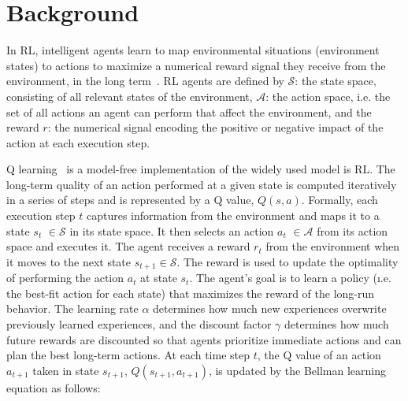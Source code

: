 
\section{Background}
\label{sec:background}

In \ac{RL}, intelligent agents learn to map environmental situations (environment states) to actions to maximize a numerical reward signal they receive from the environment, in the long term~\cite{sutton18}. \ac{RL} agents are defined by
$\mathcal{S}$: the state space, consisting of all relevant states of the environment,
$\mathcal{A}$: the action space, i.e. the set of all actions an agent can perform that affect the environment, and the reward $r$: the numerical signal encoding the positive or negative impact of the action at each execution step.

Q learning~\cite{watkins92} is a model-free implementation of the widely used model
is \ac{RL}. The long-term quality of an action performed at a given state is computed iteratively in a series of steps and is represented by a Q value,
$\mathit{Q(s,a)}$.
Formally, each execution step $t$ captures information from the environment and maps it to a state
{\color{purple}$s_t$} $\in \mathcal{S}$ in its state space. It then selects an
action {\color{purple}$a_t$} $\in \mathcal{A}$ from its action space and executes it. The agent
receives a reward {\color{Bittersweet}$r_t$} from the environment when it moves to the next state
$s_{t+1} \in \mathcal{S}$. The reward is used to update the optimality of performing the
action {\color{Mulberry}$a_t$} at state {\color{purple}$s_t$}. The agent's goal is to learn
a policy (\i.e. the best-fit action for each state) that maximizes the reward of the
long-run behavior. The learning rate {\color{NavyBlue} $\alpha$} determines how much new experiences 
overwrite previously learned experiences, and the discount factor {\color{RoyalBlue} $\gamma$} 
determines how much future rewards are discounted so that agents prioritize immediate actions and 
can plan the best long-term actions. At each time step $t$, the Q value of an action 
{\color{purple}$a_{t+1}$} taken in state {\color{purple}$s_{t+1}$}, $Q(s_{t+1}, a_{t+1})$, is updated by 
the Bellman learning equation as follows:

\vspace{1em}




\endinput


